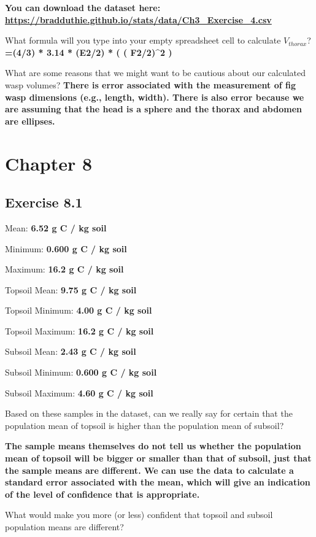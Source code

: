 \documentclass[
  openany]{krantz}
\begin{document}
\textbf{You can download the dataset here: \url{https://bradduthie.github.io/stats/data/Ch3_Exercise_4.csv}}

What formula will you type into your empty spreadsheet cell to calculate \(V_{thorax}\)? \textbf{=(4/3) * 3.14 * (E2/2) * ( ( F2/2)\^{}2 )}

What are some reasons that we might want to be cautious about our calculated wasp volumes? \textbf{There is error associated with the measurement of fig wasp dimensions (e.g., length, width). There is also error because we are assuming that the head is a sphere and the thorax and abdomen are ellipses.}

\hypertarget{chapter-8}{%
\section{Chapter 8}\label{chapter-8}}

\hypertarget{exercise-8.1}{%
\subsection{Exercise 8.1}\label{exercise-8.1}}

Mean: \textbf{6.52 g C / kg soil}

Minimum: \textbf{0.600 g C / kg soil}

Maximum: \textbf{16.2 g C / kg soil}

Topsoil Mean: \textbf{9.75 g C / kg soil}

Topsoil Minimum: \textbf{4.00 g C / kg soil}

Topsoil Maximum: \textbf{16.2 g C / kg soil}

Subsoil Mean: \textbf{2.43 g C / kg soil}

Subsoil Minimum: \textbf{0.600 g C / kg soil}

Subsoil Maximum: \textbf{4.60 g C / kg soil}

Based on these samples in the dataset, can we really say for certain that the population mean of topsoil is higher than the population mean of subsoil?

\textbf{The sample means themselves do not tell us whether the population mean of topsoil will be bigger or smaller than that of subsoil, just that the sample means are different. We can use the data to calculate a standard error associated with the mean, which will give an indication of the level of confidence that is appropriate.}

What would make you more (or less) confident that topsoil and subsoil population means are different?
\end{document}
